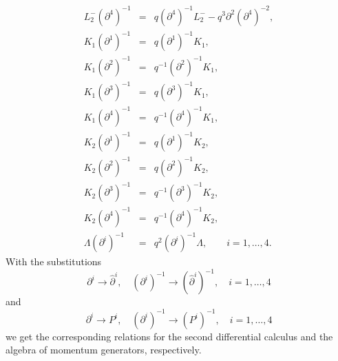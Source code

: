 \documentclass[a4paper,11pt,oneside]{article}
\begin{document}
\begin{eqnarray}
L_{2}^{-}\left( \partial ^{4}\right) ^{-1} &=&q\left( \partial ^{4}\right)
^{-1}L_{2}^{-}-q^{3}\partial ^{2}\left( \partial ^{4}\right) ^{-2}, 
\nonumber \\[0.4cm]
K_{1}\left( \partial ^{1}\right) ^{-1} &=&q\left( \partial ^{1}\right)
^{-1}K_{1}, \\
K_{1}\left( \partial ^{2}\right) ^{-1} &=&q^{-1}\left( \partial ^{2}\right)
^{-1}K_{1},  \nonumber \\
K_{1}\left( \partial ^{3}\right) ^{-1} &=&q\left( \partial ^{3}\right)
^{-1}K_{1},  \nonumber \\
K_{1}\left( \partial ^{4}\right) ^{-1} &=&q^{-1}\left( \partial ^{4}\right)
^{-1}K_{1},  \nonumber \\[0.4cm]
K_{2}\left( \partial ^{1}\right) ^{-1} &=&q\left( \partial ^{1}\right)
^{-1}K_{2}, \\
K_{2}\left( \partial ^{2}\right) ^{-1} &=&q\left( \partial ^{2}\right)
^{-1}K_{2},  \nonumber \\
K_{2}\left( \partial ^{3}\right) ^{-1} &=&q^{-1}\left( \partial ^{3}\right)
^{-1}K_{2},  \nonumber \\
K_{2}\left( \partial ^{4}\right) ^{-1} &=&q^{-1}\left( \partial ^{4}\right)
^{-1}K_{2},  \nonumber \\[0.4cm]
\Lambda \left( \partial ^{i}\right) ^{-1} &=&q^{2}\left( \partial
^{i}\right) ^{-1}\Lambda ,\qquad i=1,\ldots ,4.
\end{eqnarray}
With the substitutions 
\begin{equation}
\partial ^{i}\rightarrow \hat{\partial}^{i},\quad \left( \partial
^{i}\right) ^{-1}\rightarrow \left( \hat{\partial}^{i}\right) ^{-1},\quad
i=1,\ldots ,4
\end{equation}
and 
\begin{equation}
\partial ^{i}\rightarrow P^{i},\quad \left( \partial ^{i}\right)
^{-1}\rightarrow \left( P^{i}\right) ^{-1},\quad i=1,\ldots ,4
\end{equation}
we get the corresponding relations for the second differential calculus and
the algebra of momentum generators, respectively.
\end{document}
